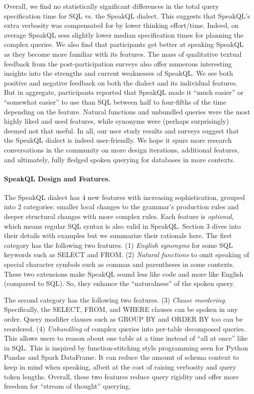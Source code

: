 Overall, we find no statistically significant differences in the total query specification time for SQL vs. the SpeakQL dialect. 
This suggests that SpeakQL's extra verbosity was compensated for by lower thinking effort/time.
Indeed, on average SpeakQL sees slightly lower median specification times for planning the complex queries. 
We also find that participants get better at speaking SpeakQL as they become more familiar with its features. 
The mass of qualitative textual feedback from the post-participation surveys also offer numerous interesting insights into the strengths and current weaknesses of SpeakQL. 
We see both positive and negative feedback on both the dialect and its individual features.
But in aggregate, participants reported that SpeakQL made it ``much easier'' or ``somewhat easier'' to use than SQL between half to four-fifths of the time depending on the feature. 
Natural functions and unbundled queries were the most highly liked and used features, while synonyms were (perhaps surprisingly) deemed not that useful. 
In all, our user study results and surveys suggest that the SpeakQL dialect is indeed user-friendly. 
We hope it spurs more research conversations in the community on more design iterations, additional features, and ultimately, fully fledged spoken querying for databases in more contexts.

\paragraph{\textbf{SpeakQL Design and Features.}}
The SpeakQL dialect has 4 new features with increasing sophistication, grouped into 2 categories: smaller local changes to the grammar's production rules and deeper structural changes with more complex rules. 
Each feature is \textit{optional}, which means regular SQL syntax is also valid in SpeakQL. 
Section 3 dives into their details with examples but we summarize their rationale here. 
The first category has the following two features. 
(1) \textit{English synonyms} for some SQL keywords such as SELECT and FROM. 
(2) \textit{Natural functions} to omit speaking of special character symbols such as commas and parentheses in some contexts.
These two extensions make SpeakQL sound less like code and more like English (compared to SQL). So, they enhance the ``naturalness'' of the spoken query.

The second category has the following two features. 
(3) \textit{Clause reordering}. Specifically, the SELECT, FROM, and WHERE clauses can be spoken in any order. Query modifier clauses such as GROUP BY and ORDER BY too can be reordered. 
(4) \textit{Unbundling} of complex queries into per-table decomposed queries. 
This allows users to reason about one table at a time instead of ``all at once'' like in SQL. 
This is inspired by function-stitching style programming seen for Python Pandas and Spark DataFrame. 
It can reduce the amount of schema context to keep in mind when speaking, albeit at the cost of raising verbosity and query token lengths. 
Overall, these two features reduce query rigidity and offer more freedom for ``stream of thought'' querying.

